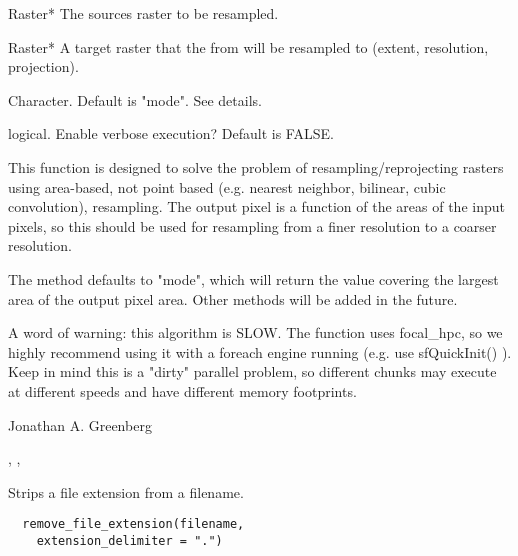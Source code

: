 \documentclass[a4paper]{book}
\begin{document}
%
\begin{Arguments}
\begin{ldescription}
\item[\code{from}] Raster* The sources raster to be resampled.

\item[\code{to}] Raster* A target raster that the from will be
resampled to (extent, resolution, projection).

\item[\code{method}] Character. Default is "mode". See details.

\item[\code{verbose}] logical. Enable verbose execution? Default
is FALSE.
\end{ldescription}
\end{Arguments}
%
\begin{Details}\relax
This function is designed to solve the problem of
resampling/reprojecting rasters using area-based, not
point based (e.g. nearest neighbor, bilinear, cubic
convolution), resampling.  The output pixel is a function
of the areas of the input pixels, so this should be used
for resampling from a finer resolution to a coarser
resolution.

The method defaults to "mode", which will return the
value covering the largest area of the output pixel area.
Other methods will be added in the future.

A word of warning: this algorithm is SLOW.  The function
uses focal\_hpc, so we highly recommend using it with a
foreach engine running (e.g. use sfQuickInit() ). Keep in
mind this is a "dirty" parallel problem, so different
chunks may execute at different speeds and have different
memory footprints.
\end{Details}
%
\begin{Author}\relax
Jonathan A. Greenberg
\end{Author}
%
\begin{SeeAlso}\relax
{},
,
\end{SeeAlso}
%
\begin{Description}\relax
Strips a file extension from a filename.
\end{Description}
%
\begin{Usage}
\begin{verbatim}
  remove_file_extension(filename,
    extension_delimiter = ".")
\end{verbatim}
\end{Usage}
\end{document}
